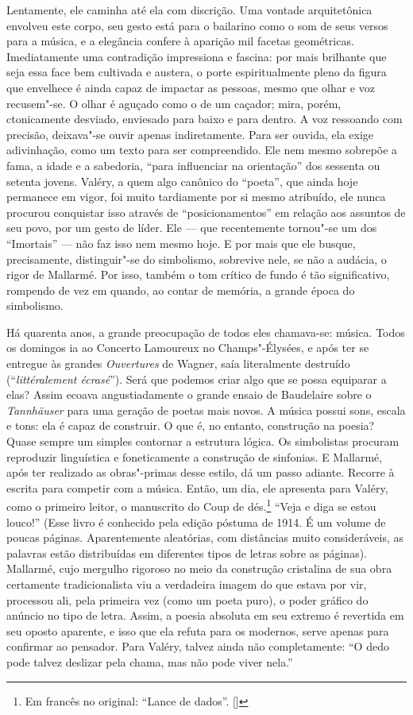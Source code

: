 Lentamente, ele caminha até ela com discrição. Uma vontade
arquitetônica envolveu este corpo, seu gesto está para o bailarino como
o som de seus versos para a música, e a elegância confere à aparição mil
facetas geométricas. Imediatamente uma contradição impressiona e
fascina: por mais brilhante que seja essa face bem cultivada e austera,
o porte espiritualmente pleno da figura que envelhece é ainda capaz de
impactar as pessoas, mesmo que olhar e voz recusem"-se. O olhar é
aguçado como o de um caçador; mira, porém, ctonicamente desviado, enviesado
para baixo e para dentro. A voz ressoando com precisão, deixava"-se ouvir apenas
indiretamente. Para ser ouvida, ela exige adivinhação, como um texto
para ser compreendido. Ele nem mesmo sobrepõe a fama, a idade e a sabedoria,
``para influenciar na orientação'' dos sessenta ou setenta jovens.
Valéry, a quem algo canônico do ``poeta'', que ainda hoje permanece em
vigor, foi muito tardiamente por si mesmo atribuído, ele nunca
procurou conquistar isso através de ``posicionamentos'' em relação aos
assuntos de seu povo, por um gesto de líder. Ele --- que recentemente
tornou"-se um dos ``Imortais'' --- não faz isso nem mesmo hoje. E por mais
que ele busque, precisamente, distinguir"-se do simbolismo, sobrevive nele, se não a audácia, o rigor de
Mallarmé. Por isso, também o
tom crítico de fundo é tão significativo, rompendo de vez em quando, ao
contar de memória, a grande época do simbolismo.

Há quarenta anos, a grande preocupação de todos eles chamava-se: música.
Todos os domingos ia ao Concerto Lamoureux no Champs"-Élysées, e após ter se entregue às 
grandes \emph{Ouvertures} de Wagner, saía literalmente destruído (``\emph{littéralement %
écrasé}''). Será que podemos criar algo que se possa equiparar
a elas? Assim ecoava angustiadamente o grande ensaio de Baudelaire
sobre o \emph{Tannhäuser} para uma geração de poetas mais novos. A música possui
sons, escala e tons: ela é capaz de construir. O que é, no entanto,
construção na poesia? Quase sempre um simples contornar a estrutura
lógica. Os simbolistas procuram reproduzir linguística e foneticamente a
construção de sinfonias. E Mallarmé, após ter realizado as obras"-primas
desse estilo, dá um passo adiante. Recorre à
escrita para competir com a música. Então, um dia, ele apresenta para
Valéry, como o primeiro leitor, o manuscrito do {Coup de dés}.\footnote{Em francês no original: ``Lance de dados''. []} ``Veja
e diga se estou louco!'' (Esse livro é conhecido pela edição póstuma de
1914. É um volume de poucas páginas. Aparentemente aleatórias,
com distâncias muito consideráveis, as palavras estão distribuídas em
diferentes tipos de letras sobre as páginas). Mallarmé, cujo mergulho
rigoroso no meio da construção cristalina de sua obra certamente
tradicionalista viu a verdadeira imagem do que estava por vir, processou
ali, pela primeira vez (como um poeta puro), o poder gráfico do anúncio
no tipo de letra. Assim, a poesia absoluta em seu extremo é revertida em seu oposto
aparente, e isso que ela refuta para os modernos, serve apenas para confirmar ao pensador. Para Valéry, talvez ainda não completamente: ``O dedo
pode talvez deslizar pela chama, mas não pode viver nela.''
